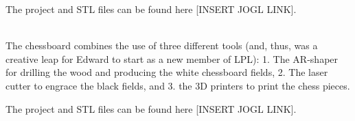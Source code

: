 \documentclass{report}
\begin{document}
The project and STL files can be found here [INSERT JOGL LINK].

\clearpage
\begin{figure}
    \centering
\end{figure}
\clearpage

 \\

The chessboard combines the use of three different tools (and, thus, was a creative leap for Edward to start as a new member of LPL): 1. The AR-shaper for drilling the wood and producing the white chessboard fields, 2. The laser cutter to engrace the black fields, and 3. the 3D printers to print the chess pieces.

The project and STL files can be found here [INSERT JOGL LINK].

\clearpage
\begin{figure}
    \centering
\end{figure}
\clearpage
\end{document}

